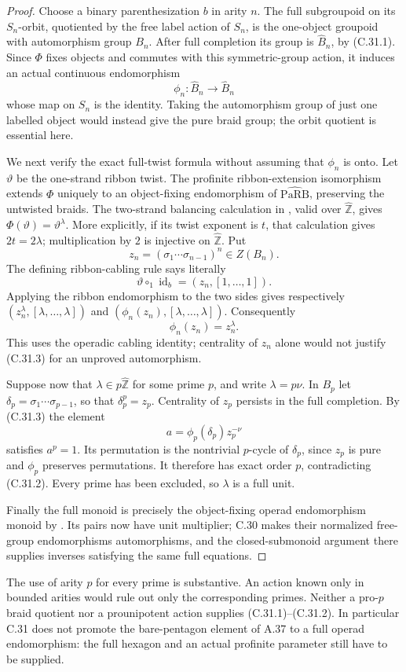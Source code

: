 \documentclass[11pt]{article}
\begin{document}
\begin{proof}
Choose a binary parenthesization $b$ in arity $n$. The full subgroupoid
on its $S_n$-orbit, quotiented by the free label action of $S_n$, is
the one-object groupoid with automorphism group $B_n$. After full
completion its group is $\widehat B_n$, by (C.31.1). Since $\Phi$
fixes objects and commutes with this symmetric-group action, it
induces an actual continuous endomorphism
\[
                \phi_n:\widehat B_n\longrightarrow\widehat B_n
\]
whose map on $S_n$ is the identity. Taking the automorphism group of
just one labelled object would instead give the pure braid group;
the orbit quotient is essential here.

We next verify the exact full-twist formula without assuming that
$\phi_n$ is onto. Let $\vartheta$ be the one-strand ribbon twist.
The profinite ribbon-extension isomorphism
\cite[Proposition 8.1]{CEBHR2019} extends $\Phi$ uniquely to an
object-fixing endomorphism of $\widehat{\mathrm{PaRB}}$, preserving
the untwisted braids. The two-strand balancing calculation in
\cite[Proposition 7.7]{CEBHR2019}, valid over
$\widehat{\mathbb Z}$, gives
$\Phi(\vartheta)=\vartheta^\lambda$. More explicitly, if its
twist exponent is $t$, that calculation gives $2t=2\lambda$;
multiplication by $2$ is injective on $\widehat{\mathbb Z}$.
Put
\[
 z_n=(\sigma_1\cdots\sigma_{n-1})^n\in Z(B_n).
\]
The defining ribbon-cabling rule
\cite[Definition 6.4]{CEBHR2019} says literally
\[
 \vartheta\circ_1\operatorname{id}_b=(z_n,[1,\ldots,1]).
\]
Applying the ribbon endomorphism to the two sides gives respectively
$(z_n^\lambda,[\lambda,\ldots,\lambda])$ and
$(\phi_n(z_n),[\lambda,\ldots,\lambda])$. Consequently
\[
                         \phi_n(z_n)=z_n^\lambda.                \tag{C.31.3}
\]
This uses the operadic cabling identity; centrality of $z_n$ alone
would not justify (C.31.3) for an unproved automorphism.

Suppose now that $\lambda\in p\widehat{\mathbb Z}$ for some prime
$p$, and write $\lambda=p\nu$. In $B_p$ let
$\delta_p=\sigma_1\cdots\sigma_{p-1}$, so that
$\delta_p^p=z_p$. Centrality of $z_p$ persists in the full completion.
By (C.31.3) the element
\[
                  a=\phi_p(\delta_p)z_p^{-\nu}
\]
satisfies $a^p=1$. Its permutation is the nontrivial $p$-cycle of
$\delta_p$, since $z_p$ is pure and $\phi_p$ preserves permutations.
It therefore has exact order $p$, contradicting (C.31.2). Every
prime has been excluded, so $\lambda$ is a full unit.

Finally the full monoid is precisely the object-fixing operad
endomorphism monoid by \cite[Proposition 7.3]{CEBHR2019}. Its pairs
now have unit multiplier; C.30 makes their normalized free-group
endomorphisms automorphisms, and the closed-submonoid argument there
supplies inverses satisfying the same full equations.
\end{proof}

The use of arity $p$ for every prime is substantive. An action known
only in bounded arities would rule out only the corresponding
primes. Neither a pro-$p$ braid quotient nor a prounipotent action
supplies (C.31.1)--(C.31.2). In particular C.31 does not promote the
bare-pentagon element of A.37 to a full operad endomorphism: the full
hexagon and an actual profinite parameter still have to be supplied.
\end{document}
